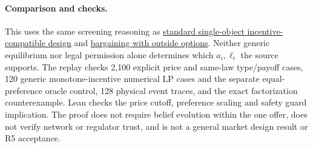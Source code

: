 \documentclass{article}
\begin{document}
\paragraph{Comparison and checks.}
This uses the same screening reasoning as \href{https://www.cs.princeton.edu/courses/archive/spring09/cos444/papers/myerson81.pdf}{standard single-object incentive-compatible design} and \href{https://doi.org/10.1016/j.jet.2016.10.008}{bargaining with outside options}. Neither generic equilibrium nor legal permission alone determines which $a_i,\ell_i$ the source supports. The replay checks 2,100 explicit price and same-law type/payoff cases, 120 generic monotone-incentive numerical LP cases and the separate equal-preference oracle control, 128 physical event traces, and the exact factorization counterexample. Lean checks the price cutoff, preference scaling and safety guard implication. The proof does not require belief evolution within the one offer, does not verify network or regulator trust, and is not a general market design result or R5 acceptance.
\end{document}
